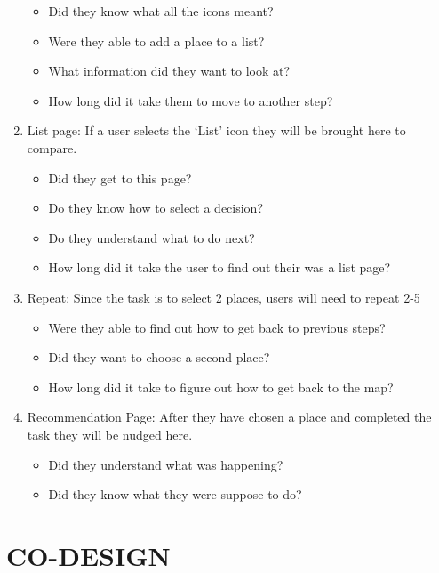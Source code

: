 \documentclass[a4 paper, 12pt]{article}
\begin{document}
\begin{enumerate}
\begin{itemize}
                    \item Did they know what all the icons meant?
                    \item Were they able to add a place to a list?
                    \item What information did they want to look at?
                    \item How long did it take them to move to another step?
                \end{itemize}
            \item List page:
            If a user selects the ‘List’ icon they will be brought here to compare.
                \begin{itemize}            
                    \item Did they get to this page?
                    \item Do they know how to select a decision?
                    \item Do they understand what to do next?
                    \item How long did it take the user to find out their was a list page?
                \end{itemize}
            \item Repeat: 
            Since the task is to select 2 places, users will need to repeat 2-5
                \begin{itemize}
                    \item Were they able to find out how to get back to previous steps?
                    \item Did they want to choose a second place?
                    \item How long did it take to figure out how to get back to the map?
                \end{itemize}
            \item Recommendation Page:
            After they have chosen a place and completed the task they will be nudged here.
                \begin{itemize}
                    \item Did they understand what was happening?
                    \item Did they know what they were suppose to do?
                \end{itemize}        
        \end{enumerate}

\section*{CO-DESIGN}
\end{document}
